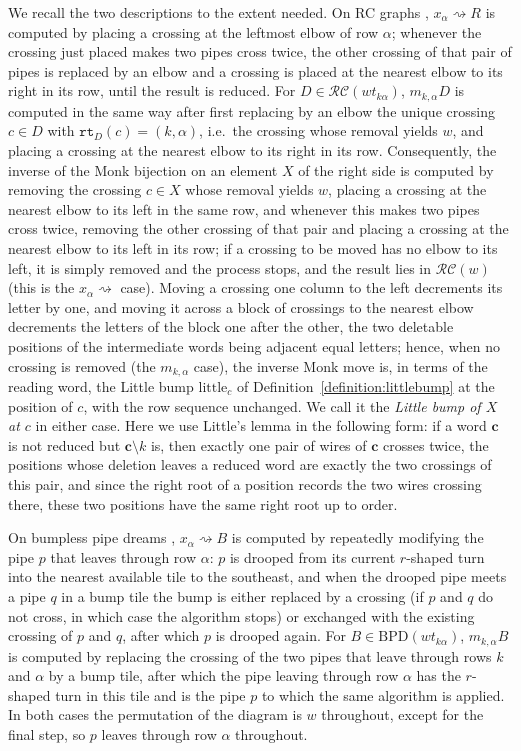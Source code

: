\documentclass{amsart}
\theoremstyle{definition}
\theoremstyle{remark}
\numberwithin{equation}{subsection}
\newcommand{\rtt}{\mathtt{rt}}
\newcommand{\RC}{\mathcal{RC}}
\newcommand{\ltb}{\mathrm{little}}
\begin{document}
We recall the two descriptions to the extent needed. On RC graphs \cite[Definition~4.2]{GaoHuang2023}, $x_\alpha\!\rightsquigarrow R$ is computed by placing a crossing at the leftmost elbow of row $\alpha$; whenever the crossing just placed makes two pipes cross twice, the other crossing of that pair of pipes is replaced by an elbow and a crossing is placed at the nearest elbow to its right in its row, until the result is reduced. For $D\in\RC(wt_{k\alpha})$, $m_{k,\alpha}D$ is computed in the same way after first replacing by an elbow the unique crossing $c\in D$ with $\rtt_D(c)=(k,\alpha)$, i.e.\ the crossing whose removal yields $w$, and placing a crossing at the nearest elbow to its right in its row. Consequently, the inverse of the Monk bijection on an element $X$ of the right side is computed by removing the crossing $c\in X$ whose removal yields $w$, placing a crossing at the nearest elbow to its left in the same row, and whenever this makes two pipes cross twice, removing the other crossing of that pair and placing a crossing at the nearest elbow to its left in its row; if a crossing to be moved has no elbow to its left, it is simply removed and the process stops, and the result lies in $\RC(w)$ (this is the $x_\alpha\!\rightsquigarrow$ case). Moving a crossing one column to the left decrements its letter by one, and moving it across a block of crossings to the nearest elbow decrements the letters of the block one after the other, the two deletable positions of the intermediate words being adjacent equal letters; hence, when no crossing is removed (the $m_{k,\alpha}$ case), the inverse Monk move is, in terms of the reading word, the Little bump $\ltb_c$ of Definition~\ref{definition:littlebump} at the position of $c$, with the row sequence unchanged. We call it the \emph{Little bump of $X$ at $c$} in either case. Here we use Little's lemma \cite[Lemma~4]{little2003combinatorial} in the following form: if a word $\mathbf c$ is not reduced but $\mathbf c\setminus k$ is, then exactly one pair of wires of $\mathbf c$ crosses twice, the positions whose deletion leaves a reduced word are exactly the two crossings of this pair, and since the right root of a position records the two wires crossing there, these two positions have the same right root up to order.

On bumpless pipe dreams \cite[Algorithm~1 and proof of Theorem~2]{huang2020monk}, $x_\alpha\!\rightsquigarrow B$ is computed by repeatedly modifying the pipe $p$ that leaves through row $\alpha$: $p$ is drooped from its current $r$-shaped turn into the nearest available tile to the southeast, and when the drooped pipe meets a pipe $q$ in a bump tile the bump is either replaced by a crossing (if $p$ and $q$ do not cross, in which case the algorithm stops) or exchanged with the existing crossing of $p$ and $q$, after which $p$ is drooped again. For $B\in\mathrm{BPD}(wt_{k\alpha})$, $m_{k,\alpha}B$ is computed by replacing the crossing of the two pipes that leave through rows $k$ and $\alpha$ by a bump tile, after which the pipe leaving through row $\alpha$ has the $r$-shaped turn in this tile and is the pipe $p$ to which the same algorithm is applied. In both cases the permutation of the diagram is $w$ throughout, except for the final step, so $p$ leaves through row $\alpha$ throughout.
\end{document}
